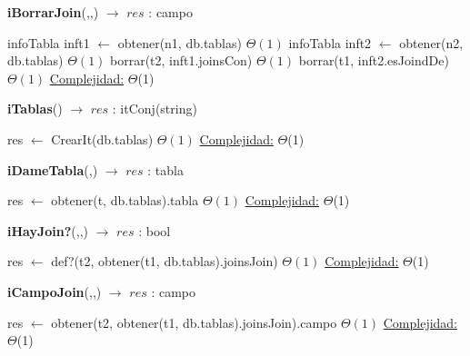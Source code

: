 \begin{algorithm}[H]{\textbf{iBorrarJoin}(,,) $\to$ $res$ : campo }
    	\begin{algorithmic}[1]
   	  		\State infoTabla inft1 $\gets$ obtener(n1, db.tablas)     \Comment $\Theta(1)$
    		\State infoTabla inft2 $\gets$ obtener(n2, db.tablas)     \Comment $\Theta(1)$
			\State borrar(t2, inft1.joinsCon)    \Comment $\Theta(1)$
			\State borrar(t1, inft2.esJoindDe)  \Comment $\Theta(1)$
			\medskip
			\Statex \underline{Complejidad:} $\Theta$(1) 
    	\end{algorithmic}
\end{algorithm}




\begin{algorithm}[H]{\textbf{iTablas}() $\to$ $res$ : itConj(string) }
    	\begin{algorithmic}[1]
    		\State res $\gets$ CrearIt(db.tablas)    \Comment $\Theta(1)$
			\medskip
			\Statex \underline{Complejidad:} $\Theta$(1) 
    	\end{algorithmic}
\end{algorithm}

\begin{algorithm}[H]{\textbf{iDameTabla}(,) $\to$ $res$ : tabla }
    	\begin{algorithmic}[1]
    		\State res $\gets$ obtener(t, db.tablas).tabla    \Comment $\Theta(1)$
			\medskip
			\Statex \underline{Complejidad:} $\Theta$(1) 
    	\end{algorithmic}
\end{algorithm}

\begin{algorithm}[H]{\textbf{iHayJoin?}(,,) $\to$ $res$ : bool }
    	\begin{algorithmic}[1]
    		\State res $\gets$ def?(t2, obtener(t1, db.tablas).joinsJoin)    \Comment $\Theta(1)$
			\medskip
			\Statex \underline{Complejidad:} $\Theta$(1) 
    	\end{algorithmic}
\end{algorithm}


\begin{algorithm}[H]{\textbf{iCampoJoin}(,,) $\to$ $res$ : campo }
    	\begin{algorithmic}[1]
    		\State res $\gets$ obtener(t2, obtener(t1, db.tablas).joinsJoin).campo    \Comment $\Theta(1)$
			\medskip
			\Statex \underline{Complejidad:} $\Theta$(1) 
    	\end{algorithmic}
\end{algorithm}


